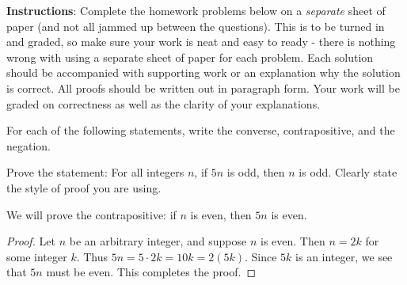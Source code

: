 \documentclass[11pt]{exam}
\def\and{\wedge}
\def\imp{\rightarrow}
\begin{document}
\noindent \textbf{Instructions}: Complete the homework problems below on a {\em separate} sheet of paper (and not all jammed up between the questions).  This is to be turned in and graded, so make sure your work is neat and easy to ready - there is nothing wrong with using a separate sheet of paper for each problem. Each solution should be accompanied with supporting work or an explanation why the solution is correct. All proofs should be written out in paragraph form.  Your work will be graded on correctness as well as the clarity of your explanations. 

\begin{questions}
\question[6] For each of the following statements, write the converse, contrapositive, and the negation.

\question[5] Prove the statement: For all integers $n$, if $5n$ is odd, then $n$ is odd.  Clearly state the style of proof you are using.
\begin{solution}
We will prove the contrapositive: if $n$ is even, then $5n$ is even.
  \begin{proof}
    Let $n$ be an arbitrary integer, and suppose $n$ is even.  Then $n = 2k$ for some integer $k$.  Thus $5n = 5\cdot 2k = 10k = 2(5k)$.  Since $5k$ is an integer, we see that $5n$ must be even.  This completes the proof.
  \end{proof}


\end{solution}
\end{questions}
\end{document}
